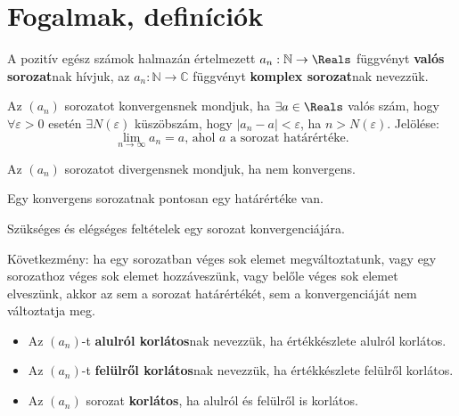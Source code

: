 \section{Fogalmak, definíciók}

\begin{definition}[Sorozat]
  A pozitív egész számok halmazán értelmezett $a_n:\mathbb{N}\rightarrow
    \Reals$ függvényt \textbf{valós sorozat}nak hívjuk,
  az $a_n:\mathbb{N}\rightarrow \mathbb{C}$ függvényt \textbf{komplex
    sorozat}nak nevezzük.
\end{definition}

\begin{definition}[Konvergencia]
  Az $(a_n)$ sorozatot konvergensnek mondjuk, ha $\exists a \in \Reals$ valós
  szám, hogy $\forall \varepsilon > 0$ esetén $\exists N(\varepsilon)$
  küszöbszám, hogy $|a_n - a| < \varepsilon$, ha $n > N(\varepsilon)$.
  Jelölése:
  \[
    \lim_{n \rightarrow \infty} a_n = a
    \text{, ahol $a$ a sorozat határértéke.}
  \]
\end{definition}

\begin{definition}[Divergencia]
  Az $(a_n)$ sorozatot divergensnek mondjuk, ha nem konvergens.
\end{definition}

\begin{note}
  Egy konvergens sorozatnak pontosan egy határértéke van.
\end{note}

\begin{note}
  Szükséges és elégséges feltételek egy sorozat konvergenciájára.

  Következmény: ha egy sorozatban véges sok elemet megváltoztatunk, vagy egy
  sorozathoz véges sok elemet hozzáveszünk, vagy belőle véges sok elemet
  elveszünk, akkor az sem a sorozat határértékét, sem a konvergenciáját nem
  változtatja meg.
\end{note}

\begin{definition}
  \begin{itemize}
    \item Az $(a_n)$-t \textbf{alulról korlátos}nak nevezzük,
          ha értékkészlete alulról korlátos.
    \item Az $(a_n)$-t \textbf{felülről korlátos}nak nevezzük,
          ha értékkészlete felülről korlátos.
    \item Az $(a_n)$ sorozat \textbf{korlátos},
          ha alulról és felülről is korlátos.
  \end{itemize}
\end{definition}

